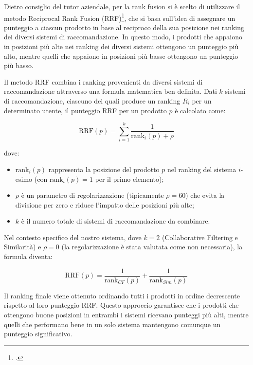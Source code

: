 Dietro consiglio del tutor aziendale, per la rank fusion si è scelto di utilizzare il metodo Reciprocal Rank Fusion (RRF)\footcite{site:rrf-explained}, che si basa sull'idea di assegnare un punteggio a ciascun prodotto in base al reciproco della sua posizione nei ranking dei diversi sistemi di raccomandazione. In questo modo, i prodotti che appaiono in posizioni più alte nei ranking dei diversi sistemi ottengono un punteggio più alto, mentre quelli che appaiono in posizioni più basse ottengono un punteggio più basso.

Il metodo RRF combina i ranking provenienti da diversi sistemi di raccomandazione attraverso una formula matematica ben definita. Dati $k$ sistemi di raccomandazione, ciascuno dei quali produce un ranking $R_i$ per un determinato utente, il punteggio RRF per un prodotto $p$ è calcolato come:

\begin{equation}
\text{RRF}(p) = \sum_{i=1}^{k} \frac{1}{\text{rank}_i(p) + \rho}
\end{equation}

dove:
\begin{itemize}
    \item $\text{rank}_i(p)$ rappresenta la posizione del prodotto $p$ nel ranking del sistema $i$-esimo (con $\text{rank}_i(p) = 1$ per il primo elemento);
    \item $\rho$ è un parametro di regolarizzazione (tipicamente $\rho = 60$) che evita la divisione per zero e riduce l'impatto delle posizioni più alte;
    \item $k$ è il numero totale di sistemi di raccomandazione da combinare.
\end{itemize}

Nel contesto specifico del nostro sistema, dove $k = 2$ (Collaborative Filtering e Similarità) e $\rho = 0$ (la regolarizzazione è stata valutata come non necessaria), la formula diventa:

\begin{equation}
\text{RRF}(p) = \frac{1}{\text{rank}_{CF}(p)} + \frac{1}{\text{rank}_{Sim}(p)}
\end{equation}

Il ranking finale viene ottenuto ordinando tutti i prodotti in ordine decrescente rispetto al loro punteggio RRF. Questo approccio garantisce che i prodotti che ottengono buone posizioni in entrambi i sistemi ricevano punteggi più alti, mentre quelli che performano bene in un solo sistema mantengono comunque un punteggio significativo.

